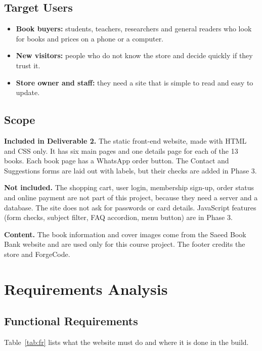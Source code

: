 \documentclass[12pt,a4paper]{article}
\begin{document}
\subsection{Target Users}
\begin{itemize}
  \item \textbf{Book buyers:} students, teachers, researchers and general readers who look for books and prices on a phone or a computer.
  \item \textbf{New visitors:} people who do not know the store and decide quickly if they trust it.
  \item \textbf{Store owner and staff:} they need a site that is simple to read and easy to update.
\end{itemize}

\subsection{Scope}
\textbf{Included in Deliverable 2.} The static front-end website, made with HTML and CSS only. It has six main pages and one details page for each of the 13 books. Each book page has a WhatsApp order button. The Contact and Suggestions forms are laid out with labels, but their checks are added in Phase 3.

\textbf{Not included.} The shopping cart, user login, membership sign-up, order status and online payment are not part of this project, because they need a server and a database. The site does not ask for passwords or card details. JavaScript features (form checks, subject filter, FAQ accordion, menu button) are in Phase 3.

\textbf{Content.} The book information and cover images come from the Saeed Book Bank website and are used only for this course project. The footer credits the store and ForgeCode.

\section{Requirements Analysis}

\subsection{Functional Requirements}
Table~\ref{tab:fr} lists what the website must do and where it is done in the build.
\end{document}
